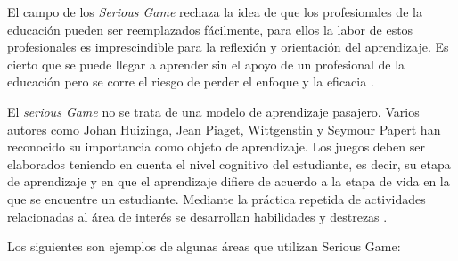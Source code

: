El campo de los \emph{Serious Game} rechaza la idea de que los profesionales de la educación pueden ser reemplazados fácilmente, para ellos la labor de estos profesionales es imprescindible para la reflexión y orientación del aprendizaje. Es cierto que se puede llegar a aprender sin el apoyo de un profesional de la educación pero se corre el riesgo de perder el enfoque y la eficacia \cite{elearning:seiousgames}. 

El \emph{serious Game} no se trata de una modelo de aprendizaje pasajero. Varios autores como Johan Huizinga, Jean Piaget, Wittgenstin y Seymour Papert han reconocido su importancia  como objeto de aprendizaje. Los juegos deben ser elaborados teniendo en cuenta el nivel cognitivo del estudiante, es decir, su etapa de aprendizaje y en que el aprendizaje difiere de acuerdo a la etapa de vida en la que se encuentre un estudiante. Mediante la práctica repetida de actividades relacionadas al área de interés se desarrollan habilidades y destrezas \cite{education:games}. 

Los siguientes son ejemplos de algunas áreas que utilizan Serious Game:

